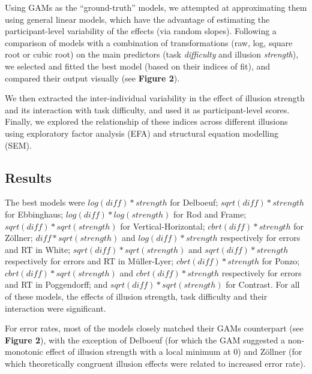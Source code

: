 \documentclass[
  man,floatsintext]{apa6}
\begin{document}
Using GAMs as the ``ground-truth'' models, we attempted at approximating them using general linear models, which have the advantage of estimating the participant-level variability of the effects (via random slopes). Following a comparison of models with a combination of transformations (raw, log, square root or cubic root) on the main predictors (task \emph{difficulty} and illusion \emph{strength}), we selected and fitted the best model (based on their indices of fit), and compared their output visually (see \textbf{Figure 2}).

We then extracted the inter-individual variability in the effect of illusion strength and its interaction with task difficulty, and used it as participant-level scores. Finally, we explored the relationship of these indices across different illusions using exploratory factor analysis (EFA) and structural equation modelling (SEM).

\hypertarget{results-1}{%
\subsection{Results}\label{results-1}}

The best models were \(log(diff)*strength\) for Delboeuf; \(sqrt(diff)*strength\) for Ebbinghaus; \(log(diff)*log(strength)\) for Rod and Frame; \(sqrt(diff)*sqrt(strength)\) for Vertical-Horizontal; \(cbrt(diff)*strength\) for Zöllner; \(diff*sqrt(strength)\) and \(log(diff)*strength\) respectively for errors and RT in White; \(sqrt(diff)*sqrt(strength)\) and \(sqrt(diff)*strength\) respectively for errors and RT in Müller-Lyer; \(cbrt(diff)*strength\) for Ponzo; \(cbrt(diff)*sqrt(strength)\) and \(cbrt(diff)*strength\) respectively for errors and RT in Poggendorff; and \(sqrt(diff)*sqrt(strength)\) for Contrast. For all of these models, the effects of illusion strength, task difficulty and their interaction were significant.

For error rates, most of the models closely matched their GAMs counterpart (see \textbf{Figure 2}), with the exception of Delboeuf (for which the GAM suggested a non-monotonic effect of illusion strength with a local minimum at 0) and Zöllner (for which theoretically congruent illusion effects were related to increased error rate).
\end{document}
